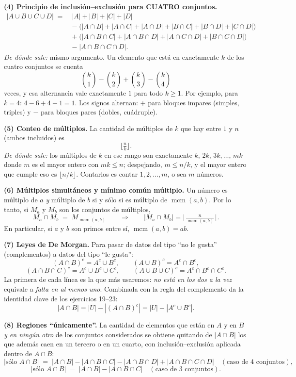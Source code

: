 \documentclass[11pt]{article}
\begin{document}
\begin{teo}
\medskip
\textbf{(4) Principio de inclusi\'on--exclusi\'on para CUATRO conjuntos.}
\begin{align*}
|A\cup B\cup C\cup D| \;=\;& |A|+|B|+|C|+|D|\\
&-\;\big(|A\cap B|+|A\cap C|+|A\cap D|+|B\cap C|+|B\cap D|+|C\cap D|\big)\\
&+\;\big(|A\cap B\cap C|+|A\cap B\cap D|+|A\cap C\cap D|+|B\cap C\cap D|\big)\\
&-\;|A\cap B\cap C\cap D|.
\end{align*}
\emph{De d\'onde sale:} mismo argumento. Un elemento que est\'a en exactamente $k$ de los cuatro conjuntos se cuenta
\[
\binom{k}{1}-\binom{k}{2}+\binom{k}{3}-\binom{k}{4}
\]
veces, y esa alternancia vale exactamente $1$ para todo $k\ge 1$. Por ejemplo, para $k=4$: $4-6+4-1=1$. Los signos alternan: $+$ para bloques impares (simples, triples) y $-$ para bloques pares (dobles, cu\'adruple).

\medskip
\textbf{(5) Conteo de m\'ultiplos.} La cantidad de m\'ultiplos de $k$ que hay entre $1$ y $n$ (ambos incluidos) es
\[
\Big\lfloor \tfrac{n}{k} \Big\rfloor .
\]
\emph{De d\'onde sale:} los m\'ultiplos de $k$ en ese rango son exactamente $k,\,2k,\,3k,\dots,\,mk$ donde $m$ es el mayor entero con $mk\le n$; despejando, $m\le n/k$, y el mayor entero que cumple eso es $\lfloor n/k\rfloor$. Contarlos es contar $1,2,\dots,m$, o sea $m$ n\'umeros.

\medskip
\textbf{(6) M\'ultiplos simult\'aneos y m\'inimo com\'un m\'ultiplo.} Un n\'umero es m\'ultiplo de $a$ \emph{y} m\'ultiplo de $b$ si y s\'olo si es m\'ultiplo de $\operatorname{mcm}(a,b)$. Por lo tanto, si $M_a$ y $M_b$ son los conjuntos de m\'ultiplos,
\[
M_a\cap M_b \;=\; M_{\operatorname{mcm}(a,b)} \qquad\Longrightarrow\qquad |M_a\cap M_b| = \Big\lfloor \tfrac{n}{\operatorname{mcm}(a,b)} \Big\rfloor .
\]
En particular, si $a$ y $b$ son primos entre s\'i, $\operatorname{mcm}(a,b)=ab$.

\medskip
\textbf{(7) Leyes de De Morgan.} Para pasar de datos del tipo ``no le gusta'' (complementos) a datos del tipo ``le gusta'':
\[
(A\cap B)^{c} = A^{c}\cup B^{c}, \qquad (A\cup B)^{c} = A^{c}\cap B^{c},
\]
\[
(A\cap B\cap C)^{c} = A^{c}\cup B^{c}\cup C^{c}, \qquad (A\cup B\cup C)^{c} = A^{c}\cap B^{c}\cap C^{c}.
\]
La primera de cada l\'inea es la que m\'as usaremos: \emph{no est\'a en los dos a la vez} equivale a \emph{falta en al menos uno}. Combinada con la regla del complemento da la identidad clave de los ejercicios 19--23:
\[
|A\cap B| = |U| - |(A\cap B)^{c}| = |U| - |A^{c}\cup B^{c}|.
\]

\medskip
\textbf{(8) Regiones ``\'unicamente''.} La cantidad de elementos que est\'an en $A$ y en $B$ \emph{y en ning\'un otro} de los conjuntos considerados se obtiene quitando de $|A\cap B|$ los que adem\'as caen en un tercero o en un cuarto, con inclusi\'on--exclusi\'on aplicada dentro de $A\cap B$:
\[
|\text{s\'olo }A\cap B| \;=\; |A\cap B| - |A\cap B\cap C| - |A\cap B\cap D| + |A\cap B\cap C\cap D| \quad (\text{caso de 4 conjuntos}),
\]
\[
|\text{s\'olo }A\cap B| \;=\; |A\cap B| - |A\cap B\cap C| \quad (\text{caso de 3 conjuntos}).
\]
\end{teo}
\end{document}
